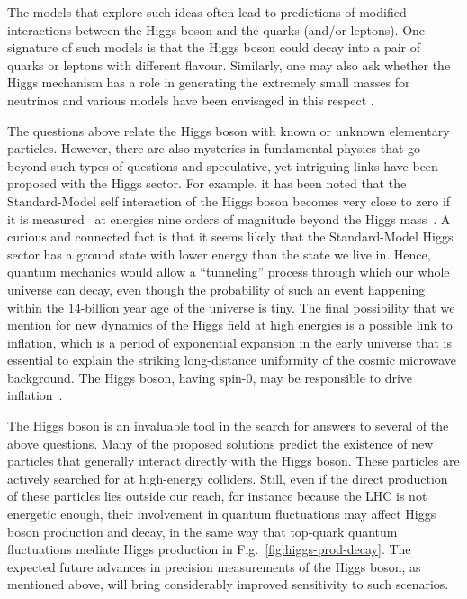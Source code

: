 \documentclass{article}
\begin{document}
The models that explore such ideas often lead to predictions of
modified interactions between the Higgs boson and the quarks (and/or
leptons). One signature of such models is that the Higgs boson could
decay into a pair of quarks or leptons with different flavour.
%
Similarly, one may also ask whether the Higgs mechanism has a role in generating
the extremely small masses for neutrinos and various models have been
envisaged in this respect \cite{deGouvea:2016qpx}.

The questions above relate the Higgs boson with known or unknown
elementary particles.
%
However, there are also mysteries in fundamental physics that go beyond
such types of questions and speculative, yet intriguing links have been
proposed with the Higgs sector.
%
For example, it has been noted that 
% 
the Standard-Model self interaction of the Higgs boson becomes very
close to zero if it is measured~\cite{Cabibbo:1979ay,Hung:1979dn,Lindner:1985uk} 
at energies nine orders of magnitude beyond the Higgs
mass~\cite{Degrassi:2012ry,Buttazzo:2013uya}. 
%
A curious and connected fact 
is that it seems likely that the Standard-Model Higgs
sector has a ground state with lower energy than the state we live in.
%
Hence, quantum mechanics would allow a ``tunneling'' process through
which our whole universe can decay, even though the probability of
such an event happening within the 14-billion year age of the universe
is tiny.
%
The final possibility that we mention for new dynamics of the Higgs
field at high energies is a possible link to inflation, which is a
period of exponential expansion in the early universe that is
essential to explain the striking long-distance uniformity of the
cosmic microwave background. The Higgs boson, having spin-0,
may be responsible to drive inflation~\cite{Bezrukov:2007ep}.

The Higgs boson is an invaluable tool in the search for answers to
several of the above questions.
%
Many of the proposed solutions predict the existence of new particles
that generally interact directly with the Higgs boson. These particles
are actively searched for at high-energy colliders. 
%
Still, even if the direct production of these particles lies outside our reach, for instance because the LHC is not energetic enough, their
involvement in quantum fluctuations may affect Higgs boson
production and decay, in the same way that top-quark quantum fluctuations
mediate Higgs production in Fig.~\ref{fig:higgs-prod-decay}.
%
The expected future advances in precision measurements of the Higgs
boson, as mentioned above, will bring considerably improved
sensitivity to such scenarios.
\end{document}
